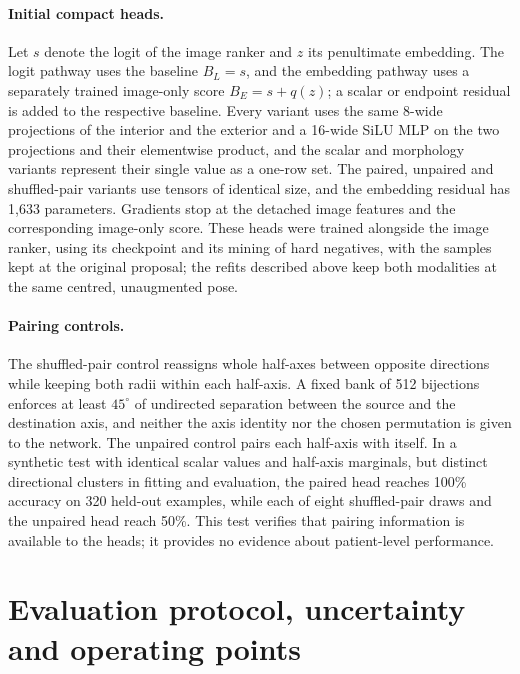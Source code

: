 \paragraph{Initial compact heads.}
Let $s$ denote the logit of the image ranker and $z$ its penultimate embedding. The logit pathway uses the baseline $B_L=s$, and the embedding pathway uses a separately trained image-only score $B_E=s+q(z)$; a scalar or endpoint residual is added to the respective baseline. Every variant uses the same 8-wide projections of the interior and the exterior and a 16-wide SiLU MLP on the two projections and their elementwise product, and the scalar and morphology variants represent their single value as a one-row set. The paired, unpaired and shuffled-pair variants use tensors of identical size, and the embedding residual has 1,633 parameters. Gradients stop at the detached image features and the corresponding image-only score. These heads were trained alongside the image ranker, using its checkpoint and its mining of hard negatives, with the samples kept at the original proposal; the refits described above keep both modalities at the same centred, unaugmented pose.

\paragraph{Pairing controls.}
The shuffled-pair control reassigns whole half-axes between opposite directions while keeping both radii within each half-axis. A fixed bank of 512 bijections enforces at least $45^\circ$ of undirected separation between the source and the destination axis, and neither the axis identity nor the chosen permutation is given to the network. The unpaired control pairs each half-axis with itself. In a synthetic test with identical scalar values and half-axis marginals, but distinct directional clusters in fitting and evaluation, the paired head reaches 100\% accuracy on 320 held-out examples, while each of eight shuffled-pair draws and the unpaired head reach 50\%. This test verifies that pairing information is available to the heads; it provides no evidence about patient-level performance.

\section{Evaluation protocol, uncertainty and operating points}
\label{supp:locked}

